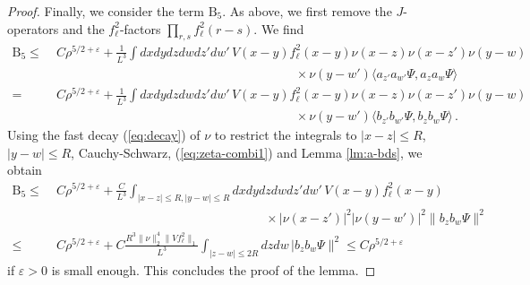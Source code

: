 \documentclass[a4paper,11pt]{article}
\def\eps{\varepsilon}
\numberwithin{equation}{section}
\begin{document}
\begin{proof}
Finally, we consider the term $\text{B}_5$. As above, we first remove the $J$-operators and the $f_\ell^2$-factors $\prod_{r,s} f_\ell^2 (r-s)$. We find 
\[ \begin{split} \text{B}_5 \leq \; &C \rho^{5/2+\eps} + \frac{1}{L^3} \int dx dy dz dw dz' dw' \, V(x-y)f_\ell^2(x-y)  \nu (x-z) \nu (x-z') \nu (y-w)  \\ &\hspace{8cm} \times \nu (y-w')\langle a_{z' }a_{w'} \Psi, a_z a_w \Psi \rangle \\ = \; &C \rho^{5/2+\eps}+ \frac{1}{L^3} \int dx dy dz dw dz' dw' \, V(x-y) f_\ell^2(x-y) \nu (x-z) \nu (x-z') \nu (y-w) \\ &\hspace{8cm} \times \nu (y-w') \langle b_{z' }b_{w'} \Psi ,b_z b_w \Psi \rangle \,. \end{split} \]
Using the fast decay (\ref{eq:decay}) of $\nu$ to restrict the integrals to $|x-z| \leq R$, $|y-w| \leq R$, Cauchy-Schwarz, (\ref{eq:zeta-combi1}) and Lemma \ref{lm:a-bds}, we obtain 
\[ \begin{split} \text{B}_5 \leq \; &C \rho^{5/2+\eps} +\frac{C}{L^3} \int_{|x-z| \leq R, |y-w| \leq R} dx dy dz dw dz' dw' \, V(x-y) f_\ell^2(x-y)\\ &\hspace{7cm} \times |\nu (x-z')|^2 |\nu (y-w')|^2  \| b_z b_w \Psi \|^2\\  \leq \; &C \rho^{5/2+\eps} + C  \frac{R^3 \| \nu \|^4_2 \|Vf_\ell^2\|_1}{L^3} \int_{|z-w| \leq 2R} dz dw \, | b_z b_w \Psi \|^2 \leq C \rho^{5/2+\eps} 
  \end{split} \]
if $\eps > 0$ is small enough. This concludes the proof of the lemma. 
\end{proof} 

\end{document}
